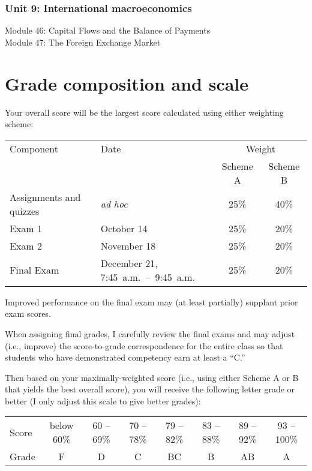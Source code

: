 \documentclass[
    letterpaper,paper=portrait,fleqn,
    DIV=16,fontsize=11pt,twoside=semi,
    parskip=full-,
    headings=standardclasses]
{scrartcl}
\begin{document}
\subsubsection*{Unit 9: International macroeconomics}

Module 46: Capital Flows and the Balance of Payments \\
Module 47: The Foreign Exchange Market

\section*{Grade composition and scale}

Your overall score will be the largest score calculated using either weighting scheme:

\vspace{0.2\baselineskip}
\begin{tabular}{llcc}
\toprule
Component               & Date               & \multicolumn{2}{c}{Weight} \\
\cmidrule{3-4}
 & & Scheme A & Scheme B \\
\midrule
Assignments and quizzes & \emph{ad hoc}                       & 25\% & 40\%  \\
Exam 1                  & October 14                          & 25\% & 20\%  \\
Exam 2                  & November 18                         & 25\% & 20\%  \\
Final Exam              & December 21, 7:45~a.m.~--~9:45~a.m. & 25\% & 20\%  \\
\bottomrule
\end{tabular}
\vspace{0.2\baselineskip}

Improved performance on the final exam may (at least partially) supplant prior exam scores.

When assigning final grades, I carefully review the final exams and may adjust (i.e., improve) the score-to-grade correspondence for the entire class so that students who have demonstrated competency earn at least a ``C.''

Then based on your maximally-weighted score (i.e., using either Scheme A or B that yields the best overall score), you will receive the following letter grade or better (I only adjust this scale to give better grades):

\vspace{0.2\baselineskip}
\begin{tabular}{lccccccc}
\toprule
Score & below 60\% & 60 -- 69\% & 70 -- 78\% & 79 -- 82\% & 83 -- 88\% & 89 -- 92\% & 93 -- 100\% \\
Grade & F & D & C & BC & B & AB & A \\
\bottomrule
\end{tabular}
\end{document}
